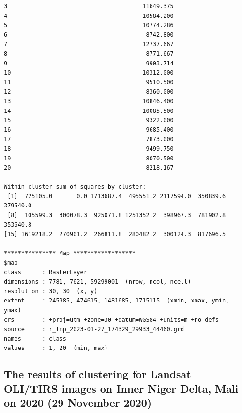 \documentclass[12pt,a4paper,oneside]{article}
\begin{document}
\begin{scriptsize}
\begin{verbatim}
3                                       11649.375
4                                       10584.200
5                                       10774.286
6                                        8742.800
7                                       12737.667
8                                        8771.667
9                                        9903.714
10                                      10312.000
11                                       9510.500
12                                       8360.000
13                                      10846.400
14                                      10085.500
15                                       9322.000
16                                       9685.400
17                                       7873.000
18                                       9499.750
19                                       8070.500
20                                       8218.167

Within cluster sum of squares by cluster:
 [1]  725105.0       0.0 1713687.4  495551.2 2117594.0  350839.6  379540.0
 [8]  105599.3  300078.3  925071.8 1251352.2  398967.3  781902.8  353640.8
[15] 1619218.2  270901.2  266811.8  280482.2  300124.3  817696.5

*************** Map ******************
$map
class      : RasterLayer 
dimensions : 7781, 7621, 59299001  (nrow, ncol, ncell)
resolution : 30, 30  (x, y)
extent     : 245985, 474615, 1481685, 1715115  (xmin, xmax, ymin, ymax)
crs        : +proj=utm +zone=30 +datum=WGS84 +units=m +no_defs 
source     : r_tmp_2023-01-27_174329_29933_44460.grd 
names      : class 
values     : 1, 20  (min, max)
\end{verbatim}
\end{scriptsize}

\subsection*{The results of clustering for Landsat OLI/TIRS images on Inner Niger Delta, Mali on 2020 (29 November 2020)}
\end{document}
